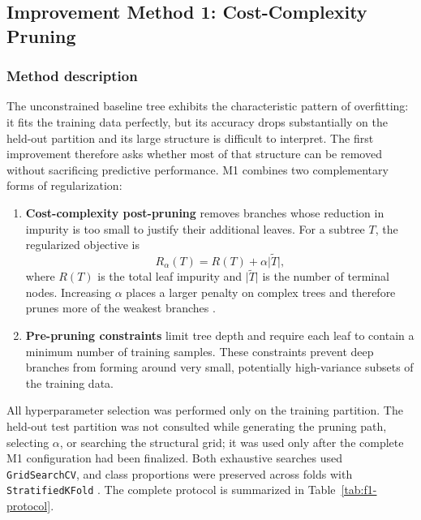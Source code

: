 
\subsection{Improvement Method 1: Cost-Complexity Pruning}
\label{sec:f1}

\subsubsection{Method description}

The unconstrained baseline tree exhibits the characteristic pattern of
overfitting: it fits the training data perfectly, but its accuracy drops
substantially on the held-out partition and its large structure is difficult
to interpret. The first improvement therefore asks whether most of that
structure can be removed without sacrificing predictive performance. M1
combines two complementary forms of regularization:

\begin{enumerate}
  \item \textbf{Cost-complexity post-pruning} removes branches whose reduction
    in impurity is too small to justify their additional leaves. For a subtree
    $T$, the regularized objective is
    \begin{equation}
      R_{\alpha}(T) = R(T) + \alpha\lvert\widetilde{T}\rvert,
      \label{eq:f1-cost-complexity}
    \end{equation}
    where $R(T)$ is the total leaf impurity and
    $\lvert\widetilde{T}\rvert$ is the number of terminal nodes. Increasing
    $\alpha$ places a larger penalty on complex trees and therefore prunes
    more of the weakest branches
    \citep{breiman1984classification,sklearn_pruning_example}.
  \item \textbf{Pre-pruning constraints} limit tree depth and require each
    leaf to contain a minimum number of training samples. These constraints
    prevent deep branches from forming around very small, potentially
    high-variance subsets of the training data.
\end{enumerate}

All hyperparameter selection was performed only on the training partition.
The held-out test partition was not consulted while generating the pruning
path, selecting $\alpha$, or searching the structural grid; it was used only
after the complete M1 configuration had been finalized. Both exhaustive
searches used \texttt{GridSearchCV}, and class proportions were preserved
across folds with \texttt{StratifiedKFold}
\citep{sklearn_gridsearchcv,sklearn_stratifiedkfold}. The complete protocol is
summarized in Table~\ref{tab:f1-protocol}.

